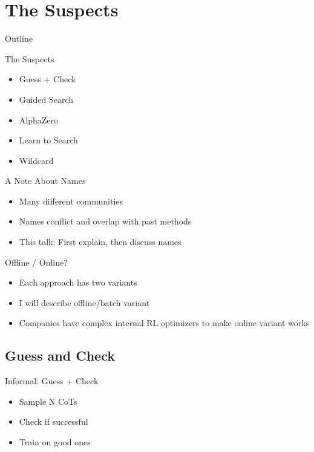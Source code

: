 \documentclass[14pt,aspectratio=169]{beamer}
\begin{document}
\section{The Suspects}

\begin{frame}{Outline}
	\tableofcontents[sections]
\end{frame}

\begin{frame}{The Suspects}
	\begin{itemize}
		\item Guess + Check
		\item Guided Search
		\item AlphaZero
		\item Learn to Search
		\item Wildcard
	\end{itemize}

\end{frame}

\begin{frame}{A Note About Names}
	\begin{itemize}
		\item Many different communities
		\item Names conflict and overlap with past methods
		\item This talk: First explain, then discuss names
	\end{itemize}
\end{frame}


\begin{frame}{Offline / Online?}
	\begin{itemize}
		\item Each approach has two variants
		\item I will describe offline/batch variant
		\item Companies have complex internal RL optimizers to make online variant works
	\end{itemize}
\end{frame}


\subsection{Guess and Check}

\begin{frame}{Informal: Guess + Check}
	\begin{itemize}
		\item Sample N CoTs
		\item Check if successful
		\item Train on good ones
	\end{itemize}
\end{frame}
\end{document}
